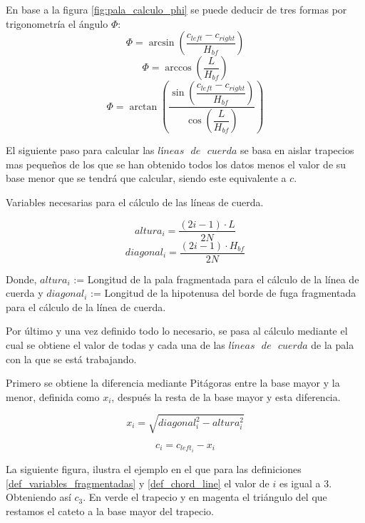 \begin{definicion}
En base a la figura \ref{fig:pala_calculo_phi} se puede deducir de tres formas por trigonometría el ángulo $\Phi$:
$$ \Phi = \arcsin{(\dfrac{c_{left} - c_{right}}{H_{bf}})} $$
$$ \Phi = \arccos{(\dfrac{L}{H_{bf}})} $$
$$ \Phi = \arctan{( \dfrac{\sin{(\dfrac{c_{left} - c_{right}}{H_{bf}})}}{\cos{(\dfrac{L}{H_{bf}})}} ) } $$
\label{def_angulo_phi}
\end{definicion}


El siguiente paso para calcular las $líneas \text{ } de \text{ } cuerda$ se basa en aislar trapecios mas pequeños de los que se han obtenido todos los datos menos el valor de su base menor que se tendrá que calcular, siendo este equivalente a $c$.\\

\begin{definicion}
Variables necesarias para el cálculo de las líneas de cuerda.

$$ altura_i = \dfrac{(2i - 1) \cdot L}{2N}$$
$$ diagonal_i = \dfrac{(2i - 1) \cdot H_{bf}}{2N}$$

Donde,
\centering
$altura_i$ := Longitud de la pala fragmentada para el cálculo de la línea de cuerda y $diagonal_i$ := Longitud de la hipotenusa del borde de fuga fragmentada para el cálculo de la línea de cuerda.
\label{def_variables_fragmentadas}
\end{definicion}

Por último y una vez definido todo lo necesario, se pasa al cálculo mediante el cual se obtiene el valor de todas y cada una de las $líneas \text{ } de \text{ } cuerda$ de la pala con la que se está trabajando.

\begin{definicion}
Primero se obtiene la diferencia mediante Pitágoras entre la base mayor y la menor, definida como $x_i$, después la resta de la base mayor y esta diferencia.

$$ x_i = \sqrt{diagonal_i^{2} - altura_i^{2}}$$

$$ c_i = c_{left_i} - x_i $$
\label{def_chord_line}
\end{definicion}

La siguiente figura, ilustra el ejemplo en el que para las definiciones \ref{def_variables_fragmentadas} y \ref{def_chord_line} el valor de $i$ es igual a 3. Obteniendo así $c_3$. En verde el trapecio y en magenta el triángulo del que restamos el cateto a la base mayor del trapecio.

